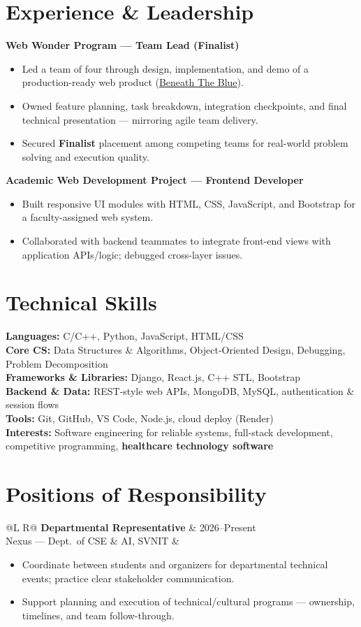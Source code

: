 \documentclass[a4paper,10pt]{article}
\makeatletter
\newcommand{\entry}[4]{%
  \vspace{0.6mm}
  \noindent\begin{tabularx}{\textwidth}{@{}L R@{}}
    \textbf{#1} & {\small #2} \\
    {\small #3} & {\small #4} \\
  \end{tabularx}\par
}
\makeatother
\begin{document}
\section{Experience \& Leadership}
\vspace{0.8mm}
\noindent\textbf{Web Wonder Program --- Team Lead (Finalist)}
\begin{itemize}
  \item Led a team of four through design, implementation, and demo of a production-ready web product (\href{https://beneath-the-blue-1-3c6o.onrender.com/}{Beneath The Blue}).
  \item Owned feature planning, task breakdown, integration checkpoints, and final technical presentation --- mirroring agile team delivery.
  \item Secured \textbf{Finalist} placement among competing teams for real-world problem solving and execution quality.
\end{itemize}

\vspace{0.8mm}
\noindent\textbf{Academic Web Development Project --- Frontend Developer}
\begin{itemize}
  \item Built responsive UI modules with HTML, CSS, JavaScript, and Bootstrap for a faculty-assigned web system.
  \item Collaborated with backend teammates to integrate front-end views with application APIs/logic; debugged cross-layer issues.
\end{itemize}

\section{Technical Skills}
\noindent\small
\textbf{Languages:} C/C++, Python, JavaScript, HTML/CSS \\[0.4mm]
\textbf{Core CS:} Data Structures \& Algorithms, Object-Oriented Design, Debugging, Problem Decomposition \\[0.4mm]
\textbf{Frameworks \& Libraries:} Django, React.js, C++ STL, Bootstrap \\[0.4mm]
\textbf{Backend \& Data:} REST-style web APIs, MongoDB, MySQL, authentication \& session flows \\[0.4mm]
\textbf{Tools:} Git, GitHub, VS Code, Node.js, cloud deploy (Render) \\[0.4mm]
\textbf{Interests:} Software engineering for reliable systems, full-stack development, competitive programming, \textbf{healthcare technology software}

\section{Positions of Responsibility}
\entry{Departmental Representative}{2026--Present}{Nexus --- Dept.\ of CSE \& AI, SVNIT}{}
\begin{itemize}
  \item Coordinate between students and organizers for departmental technical events; practice clear stakeholder communication.
  \item Support planning and execution of technical/cultural programs --- ownership, timelines, and team follow-through.
\end{itemize}
\end{document}
